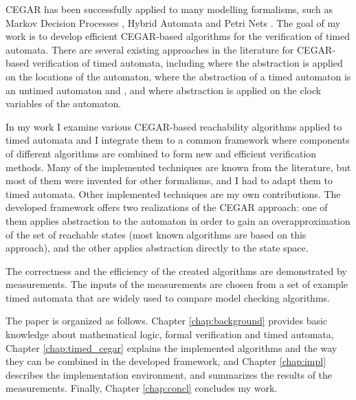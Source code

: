 CEGAR \cite{clarke2003counterexample} has been successfully applied to many modelling formalisms, such as Markov Decision Processes \cite{kwiatkowska2006game}, Hybrid Automata \cite{journals/fmsd/PrabhakarDM015} and Petri Nets \cite{journals/actaC/HajduVBM14}. The goal of my work is to develop efficient CEGAR-based algorithms for the verification of timed automata. There are several existing approaches in the literature for CEGAR-based verification of timed automata, including \cite{kemper2007sat} where the abstraction is applied on the locations of the automaton, \cite{nagaoka2010abstraction} where the abstraction of a timed automaton is an untimed
automaton and \cite{dierks2007automatic, he2010compositional}, and \cite{okano2011clock} where abstraction is applied on the clock variables of the automaton.

In my work I examine various CEGAR-based reachability algorithms applied to timed automata and I integrate them to a common framework where components of different algorithms are combined to form new and efficient verification methods. Many of the implemented techniques are known from the literature, but most of them were invented for other formalisms, and I had to adapt them to timed automata. Other implemented techniques are my own contributions. The developed framework offers two realizations of the CEGAR approach: one of them applies abstraction to the automaton in order to gain an overapproximation of the set of reachable states (most known algorithms are based on this approach), and the other applies abstraction directly to the state space. 

The correctness and the efficiency %
of the created algorithms are demonstrated by measurements. The inputs of the measurements are chosen from a set of example timed automata that are widely used to compare model checking algorithms.

The paper is organized as follows. Chapter \ref{chap:background} provides basic knowledge about mathematical logic, formal verification and timed automata, Chapter \ref{chap:timed_cegar} explains the implemented algorithms and the way they can be combined in the developed framework, and Chapter \ref{chap:impl} describes the implementation environment, and summarizes the results of the measurements. Finally, Chapter \ref{chap:concl} concludes my work.

 


